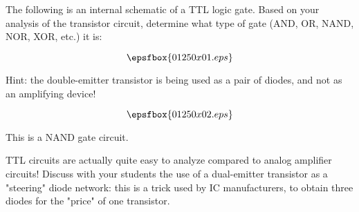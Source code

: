 

The following is an internal schematic of a TTL logic gate.  Based on your analysis of the transistor circuit, determine what type of gate (AND, OR, NAND, NOR, XOR, etc.) it is:

$$\epsfbox{01250x01.eps}$$

Hint: the double-emitter transistor is being used as a pair of diodes, and not as an amplifying device!

$$\epsfbox{01250x02.eps}$$







This is a NAND gate circuit.







TTL circuits are actually quite easy to analyze compared to analog amplifier circuits!  Discuss with your students the use of a dual-emitter transistor as a "steering" diode network: this is a trick used by IC manufacturers, to obtain three diodes for the "price" of one transistor.





